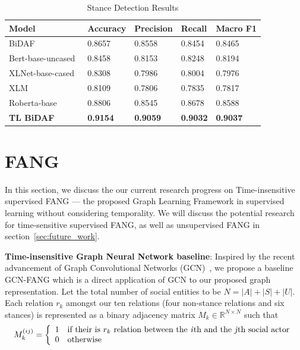 \documentclass[fyp]{socreport}
\theoremstyle{definition}
\theoremstyle{hypothesis}
\begin{document}
\begin{table}[t]
  \centering
  \tiny
  \begin{tabular}{|p{6cm}|p{2cm}|p{2cm}|p{2cm}|p{2cm}|}
  \hline
    Model & Accuracy & Precision & Recall & Macro F1 \\ \hline \hline
    BiDAF & 0.8657 & 0.8558 & 0.8454 & 0.8465 \\ \hline
    Bert-base-uncased~\cite{devlin2019bert} & 0.8458 & 0.8153 & 0.8248 & 0.8194 \\ \hline
    XLNet-base-cased~\cite{yang2019xlnet} & 0.8308 & 0.7986 & 0.8004 & 0.7976 \\ \hline
    XLM~\cite{lample2019cross} & 0.8109 & 0.7806 & 0.7835 & 0.7817 \\ \hline
    Roberta-base~\cite{liu2019roberta} & 0.8806 &	0.8545 & 0.8678 & 0.8588 \\ \hline \hline
    \textbf{TL BiDAF} & \textbf{0.9154} & \textbf{0.9059} & \textbf{0.9032} & \textbf{0.9037} \\ \hline
  \end{tabular}
  \caption{Stance Detection Results}
  \label{table:stance_results}
\end{table}

\section{FANG}
\label{sec:fang}
In this section, we discuss the our current research progress on Time-insensitive supervised FANG --- the proposed Graph Learning Framework in supervised learning without considering temporality. We will discuss the potential research for time-sensitive supervised FANG, as well as unsupervised FANG in section~\ref{sec:future_work}.

\textbf{Time-insensitive Graph Neural Network baseline}: Inspired by the recent advancement of Graph Convolutional Networks (GCN)~\cite{kipf2016semi}, we propose a baseline GCN-FANG which is a direct application of GCN to our proposed graph representation. Let the total number of social entities to be $N=|A|+|S|+|U|$. Each relation $r_k$ amongst our ten relations (four non-stance relations and six stances) is represented as a binary adjacency matrix $M_k\in \mathbb{R}^{N\times N} $ such that 
\[  M^{(ij)}_k = \left\{
\begin{array}{ll}
      1 & \textrm{if their is $r_k$ relation between the \textit{i}th and the \textit{j}th social actor} \\
      0 & \textrm{otherwise} \\
\end{array} 
\right. \]
\end{document}
